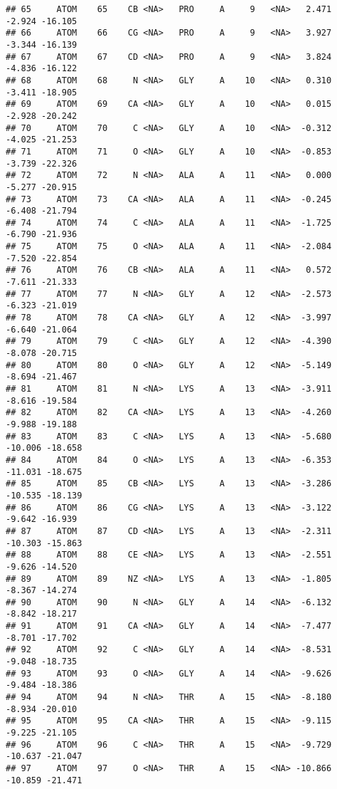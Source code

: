 \documentclass[
]{article}
\begin{document}
\begin{verbatim}
## 65     ATOM    65    CB <NA>   PRO     A     9   <NA>   2.471  -2.924 -16.105
## 66     ATOM    66    CG <NA>   PRO     A     9   <NA>   3.927  -3.344 -16.139
## 67     ATOM    67    CD <NA>   PRO     A     9   <NA>   3.824  -4.836 -16.122
## 68     ATOM    68     N <NA>   GLY     A    10   <NA>   0.310  -3.411 -18.905
## 69     ATOM    69    CA <NA>   GLY     A    10   <NA>   0.015  -2.928 -20.242
## 70     ATOM    70     C <NA>   GLY     A    10   <NA>  -0.312  -4.025 -21.253
## 71     ATOM    71     O <NA>   GLY     A    10   <NA>  -0.853  -3.739 -22.326
## 72     ATOM    72     N <NA>   ALA     A    11   <NA>   0.000  -5.277 -20.915
## 73     ATOM    73    CA <NA>   ALA     A    11   <NA>  -0.245  -6.408 -21.794
## 74     ATOM    74     C <NA>   ALA     A    11   <NA>  -1.725  -6.790 -21.936
## 75     ATOM    75     O <NA>   ALA     A    11   <NA>  -2.084  -7.520 -22.854
## 76     ATOM    76    CB <NA>   ALA     A    11   <NA>   0.572  -7.611 -21.333
## 77     ATOM    77     N <NA>   GLY     A    12   <NA>  -2.573  -6.323 -21.019
## 78     ATOM    78    CA <NA>   GLY     A    12   <NA>  -3.997  -6.640 -21.064
## 79     ATOM    79     C <NA>   GLY     A    12   <NA>  -4.390  -8.078 -20.715
## 80     ATOM    80     O <NA>   GLY     A    12   <NA>  -5.149  -8.694 -21.467
## 81     ATOM    81     N <NA>   LYS     A    13   <NA>  -3.911  -8.616 -19.584
## 82     ATOM    82    CA <NA>   LYS     A    13   <NA>  -4.260  -9.988 -19.188
## 83     ATOM    83     C <NA>   LYS     A    13   <NA>  -5.680 -10.006 -18.658
## 84     ATOM    84     O <NA>   LYS     A    13   <NA>  -6.353 -11.031 -18.675
## 85     ATOM    85    CB <NA>   LYS     A    13   <NA>  -3.286 -10.535 -18.139
## 86     ATOM    86    CG <NA>   LYS     A    13   <NA>  -3.122  -9.642 -16.939
## 87     ATOM    87    CD <NA>   LYS     A    13   <NA>  -2.311 -10.303 -15.863
## 88     ATOM    88    CE <NA>   LYS     A    13   <NA>  -2.551  -9.626 -14.520
## 89     ATOM    89    NZ <NA>   LYS     A    13   <NA>  -1.805  -8.367 -14.274
## 90     ATOM    90     N <NA>   GLY     A    14   <NA>  -6.132  -8.842 -18.217
## 91     ATOM    91    CA <NA>   GLY     A    14   <NA>  -7.477  -8.701 -17.702
## 92     ATOM    92     C <NA>   GLY     A    14   <NA>  -8.531  -9.048 -18.735
## 93     ATOM    93     O <NA>   GLY     A    14   <NA>  -9.626  -9.484 -18.386
## 94     ATOM    94     N <NA>   THR     A    15   <NA>  -8.180  -8.934 -20.010
## 95     ATOM    95    CA <NA>   THR     A    15   <NA>  -9.115  -9.225 -21.105
## 96     ATOM    96     C <NA>   THR     A    15   <NA>  -9.729 -10.637 -21.047
## 97     ATOM    97     O <NA>   THR     A    15   <NA> -10.866 -10.859 -21.471

\end{verbatim}
\end{document}
